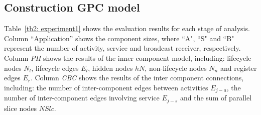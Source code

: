 \subsection{Construction GPC model}
Table~\ref{tb2: experiment1} shows the evaluation results for each stage of analysis. Column ``Application'' shows the component sizes, where ``A", ``S" and ``B" represent the number of activity, service and broadcast receiver, respectively. %
%
Column \textit{PII} shows the results of the inner component model, including: lifecycle nodes $N_{l}$, lifecycle edges $E_{l}$, hidden nodes $hN$, non-lifecycle nodes $N_{n}$ and register edges $E_{r}$. %
%
Column \textit{CBC} shows the results of the inter component connections, including: the number of inter-component edges between activities $E_{j-a}$, the number of inter-component edges involving service $E_{j-s}$ and the sum of parallel slice nodes $NSlc$. %
